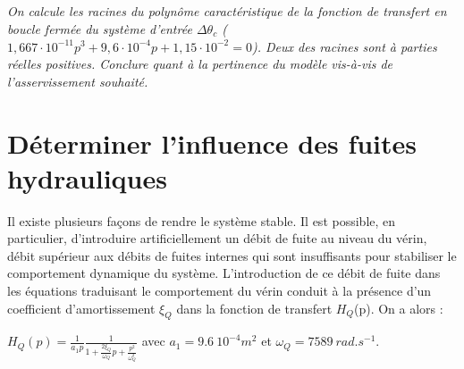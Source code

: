 \documentclass[10pt,fleqn]{article} %
\begin{document}
\begin{multicols}{2}
\subparagraph{}\textit{On calcule les racines du polynôme caractéristique de la fonction de transfert en boucle fermée du système d'entrée $\Delta \theta_c$ ($1,667\cdot 10^{-11} p^{3} +9,6\cdot 10^{-4} p+1,15\cdot 10^{-2} =0$). Deux des racines sont à parties réelles positives. Conclure quant à la pertinence du modèle vis-à-vis de l'asservissement souhaité.}


\section*{Déterminer l'influence des fuites hydrauliques}

Il existe plusieurs façons de rendre le système stable. Il est possible, en particulier, d'introduire artificiellement un débit de fuite au niveau du vérin, débit supérieur aux débits de fuites internes qui sont insuffisants pour stabiliser le comportement dynamique du système. L'introduction de ce débit de fuite dans les équations traduisant le comportement du vérin conduit à la présence d'un coefficient d'amortissement $\xi_{Q}$ dans la fonction de transfert $H_{Q}$(p). On a alors :

$H_{Q} (p)=\frac{1}{a_{1} p} \frac{1}{1+\frac{2\xi _{Q} }{\omega _{Q} }p+\frac{p^{2} }{\omega _{Q}^{2} } } $   avec $a_1=\SI{9.6}{10^{-4} m^2}$ et $\omega_Q=\SI{7589}{rad.s^{-1}}.$


\end{multicols}
\end{document}
